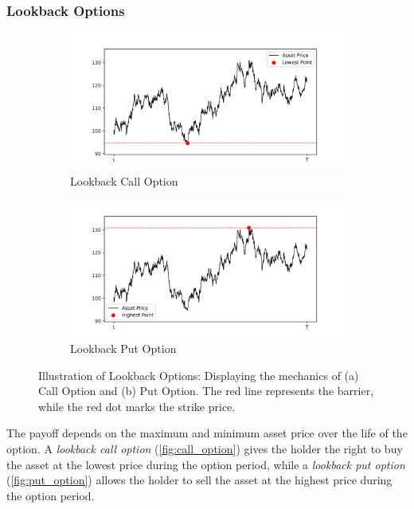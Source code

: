 \documentclass[a4paper]{report}
\begin{document}
\subsubsection{Lookback Options}
\begin{figure}[H]
    \begin{subfigure}{.5\linewidth}
      \includegraphics[width=\linewidth]{images/call_option.png}
      \caption{Lookback Call Option}
      \label{fig:call_option}
    \end{subfigure}\hfill
    \begin{subfigure}{.5\linewidth}
      \includegraphics[width=\linewidth]{images/put_option.png}
      \caption{Lookback Put Option}
      \label{fig:put_option}
    \end{subfigure}
    \caption{Illustration of Lookback Options: Displaying the mechanics of (a) Call Option and (b) Put Option. The red line represents the barrier, while the red dot marks the strike price.}
\end{figure}

\noindent The payoff depends on the maximum and minimum asset price over the life of the option. A \textit{lookback call option} (\autoref{fig:call_option}) gives the holder the right to buy the asset at the lowest price during the option period, while a \textit{lookback put option} (\autoref{fig:put_option}) allows the holder to sell the asset at the highest price during the option period.
\end{document}
